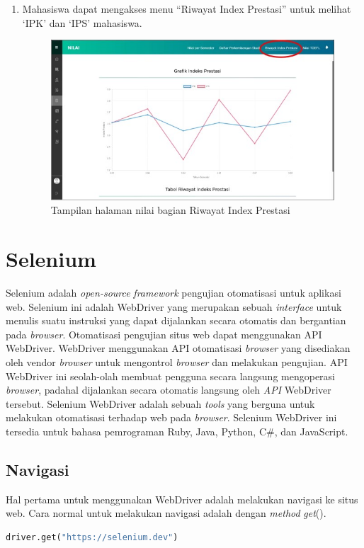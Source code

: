 \begin{enumerate}
\begin{enumerate}
\begin{figure}[H]
			\label{fig:nilai_2018}
		\end{figure}
		\item Mahasiswa dapat mengakses menu ``Riwayat Index Prestasi'' untuk melihat `IPK' dan `IPS' mahasiswa.
		\begin{figure}[H]
			\centering
			\includegraphics[scale=0.7]{Gambar/rip2018.jpg}
			\caption{Tampilan halaman nilai bagian Riwayat Index Prestasi} 
			\label{fig:rip_2018}
		\end{figure}
	\end{enumerate}	
\end{enumerate}

\section{Selenium}
\label{sec:selenium}
Selenium adalah \textit{open-source} \textit{framework} pengujian otomatisasi untuk aplikasi web\cite{selenium}. Selenium ini adalah WebDriver yang merupakan sebuah \textit{interface} untuk menulis suatu instruksi yang dapat dijalankan secara otomatis dan bergantian pada \textit{browser}. Otomatisasi pengujian situs web dapat menggunakan API WebDriver. WebDriver menggunakan API otomatisasi \textit{browser} yang disediakan oleh vendor \textit{browser} untuk mengontrol \textit{browser} dan melakukan pengujian. API WebDriver ini seolah-olah membuat pengguna secara langsung mengoperasi \textit{browser}, padahal dijalankan secara otomatis langsung oleh \textit{API} WebDriver tersebut. Selenium WebDriver adalah sebuah \textit{tools} yang berguna untuk melakukan otomatisasi terhadap web pada \textit{browser}. Selenium WebDriver ini tersedia untuk bahasa pemrograman Ruby, Java, Python, C\#, dan JavaScript. 

\subsection{Navigasi}
Hal pertama untuk menggunakan WebDriver adalah melakukan navigasi ke situs web. Cara normal untuk melakukan navigasi adalah dengan \textit{method} \textit{get}().
\begin{lstlisting}[language=python, caption=Contoh kode untuk membuka situs web, label=kode:2:navigate]
	driver.get("https://selenium.dev")
\end{lstlisting}

